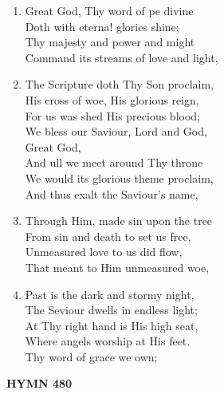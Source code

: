 \documentclass[11pt,a4paper]{article}
\begin{document}
\begin{enumerate}
    \item Great God, Thy word of pe divine \\
        Doth with eterna! glories shine; \\
        Thy majesty and power and might \\
        Command its streams of love and light,

    \item The Scripture doth Thy Son proclaim, \\
        His cross of woe, His glorious reign, \\
        For us was shed His precious blood; \\
        We bless our Saviour, Lord and God, \\
        Great God, \\
        And ull we meet around Thy throne \\
        We would its glorious theme proclaim, \\
        And thus exalt the Saviour's name,

    \item Through Him, made sin upon the tree \\
        From sin and death to set us free, \\
        Unmeasured love to us did flow, \\
        That meant to Him unmeasured woe,

    \item Past is the dark and stormy night, \\
        The Seviour dwells in endless light; \\
        At Thy right hand is His high seat, \\
        Where angels worship at His feet. \\
        Thy word of grace we own;

\end{enumerate}

\newpage
\begin{center}
    {\Large \textbf{HYMN 480}}
\end{center}
\vspace{1em}
\end{document}
